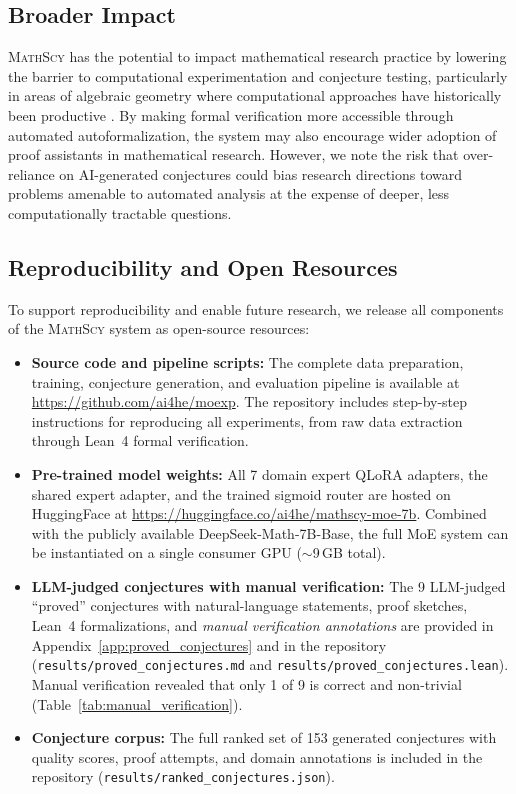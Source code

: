 \documentclass[11pt,a4paper]{article}
\newcommand{\mathscy}{\textsc{MathScy}}
\begin{document}
\subsection{Broader Impact}

\mathscy{} has the potential to impact mathematical research practice by lowering the barrier to computational experimentation and conjecture testing, particularly in areas of algebraic geometry where computational approaches have historically been productive \citep{sturmfels2002solving, cox2015ideals}. By making formal verification more accessible through automated autoformalization, the system may also encourage wider adoption of proof assistants in mathematical research. However, we note the risk that over-reliance on AI-generated conjectures could bias research directions toward problems amenable to automated analysis at the expense of deeper, less computationally tractable questions.


\subsection{Reproducibility and Open Resources}
\label{sec:reproducibility}

To support reproducibility and enable future research, we release all components of the \mathscy{} system as open-source resources:

\begin{itemize}[leftmargin=*]
    \item \textbf{Source code and pipeline scripts:} The complete data preparation, training, conjecture generation, and evaluation pipeline is available at \url{https://github.com/ai4he/moexp}. The repository includes step-by-step instructions for reproducing all experiments, from raw data extraction through Lean~4 formal verification.
    \item \textbf{Pre-trained model weights:} All 7 domain expert QLoRA adapters, the shared expert adapter, and the trained sigmoid router are hosted on HuggingFace at \url{https://huggingface.co/ai4he/mathscy-moe-7b}. Combined with the publicly available DeepSeek-Math-7B-Base, the full MoE system can be instantiated on a single consumer GPU (${\sim}$9\,GB total).
    \item \textbf{LLM-judged conjectures with manual verification:} The 9 LLM-judged ``proved'' conjectures with natural-language statements, proof sketches, Lean~4 formalizations, and \emph{manual verification annotations} are provided in Appendix~\ref{app:proved_conjectures} and in the repository (\texttt{results/proved\_conjectures.md} and \texttt{results/proved\_conjectures.lean}). Manual verification revealed that only 1 of 9 is correct and non-trivial (Table~\ref{tab:manual_verification}).
    \item \textbf{Conjecture corpus:} The full ranked set of 153 generated conjectures with quality scores, proof attempts, and domain annotations is included in the repository (\texttt{results/ranked\_conjectures.json}).
\end{itemize}
\end{document}
